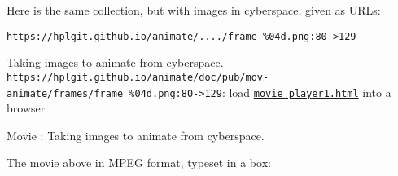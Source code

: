 \documentclass[%
oneside,                 %
final,                   %
10pt]{article}
\newenvironment{doconce:movie}{}{}
\newcounter{doconce:movie:counter}
\begin{document}
Here is the same collection, but with images in cyberspace, given as URLs:
\begin{Verbatim}[numbers=none,fontsize=\fontsize{9pt}{9pt},baselinestretch=0.95]
https://hplgit.github.io/animate/..../frame_%04d.png:80->129

\end{Verbatim}

\begin{doconce:movie}
\begin{center}
Taking images to animate from cyberspace. \Verb!https://hplgit.github.io/animate/doc/pub/mov-animate/frames/frame_%
\end{center}
\begin{center}  %
Movie : Taking images to animate from cyberspace.
\end{center}
\end{doconce:movie}
The movie above in MPEG format, typeset in a box:
\end{document}
